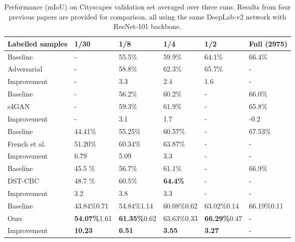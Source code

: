 \documentclass[10pt,twocolumn,letterpaper]{article}
\begin{document}
\begin{table*}[t]
    \centering
    \caption{Performance (mIoU) on Cityscapes validation set averaged over three runs. Results from four previous papers are provided for comparison, all using the same DeepLab-v2 network with ResNet-101 backbone.}
    \begin{tabular}{ l l l l l l } 
        Labelled samples & 1/30  & 1/8  & 1/4  & 1/2  & Full (2975) \\
        \hline \hline
         
        Baseline & - & 55.5\% & 59.9\% & 64.1\% & 66.4\% \\
        Adversarial \cite{Hung} & - & 58.8\% & 62.3\% & 65.7\% & - \\
        Improvement & - & 3.3 & 2.4 & 1.6 & - \\
        \hline \hline
        
        Baseline & - & 56.2\% & 60.2\% & - & 66.0\% \\
        s4GAN \cite{Mittal}\footnotemark & - & 59.3\% & 61.9\% & - & 65.8\% \\
        Improvement & - & 3.1 & 1.7 & - & -0.2 \\
        \hline \hline
        
        Baseline & 44.41\% & 55.25\% & 60.57\% & - & 67.53\% \\
        French et al. \cite{French}\footnotemark[\value{footnote}] & 51.20\% & 60.34\% & 63.87\% & - & - \\
        Improvement & 6.79 & 5.09 & 3.3 & - & - \\
        \hline \hline
        
        Baseline & 45.5 \% & 56.7\% & 61.1\% & - & 66.9\% \\
        DST-CBC \cite{Feng} & 48.7 \% & 60.5\% & \textbf{64.4\%} & - & - \\
        Improvement & 3.2 & 3.8 & 3.3 & - & - \\
        \hline \hline
        
        Baseline & 43.84\%\scriptsize{0.71} & 54.84\%\scriptsize{1.14} & 60.08\%\scriptsize{0.62} & 63.02\%\scriptsize{0.14} & 66.19\%\scriptsize{0.11} \\

        Ours & \textbf{54.07\%}\scriptsize{1.61} & \textbf{61.35\%}\scriptsize{0.62} & 63.63\%\scriptsize{0.33} & \textbf{66.29\%}\scriptsize{0.47} & - \\

        Improvement & \textbf{10.23} & \textbf{6.51} & \textbf{3.55} & \textbf{3.27} & - \\
        \hline
        
    \end{tabular}
    \label{tab:cityscapesresults}
\end{table*}{}
\end{document}
